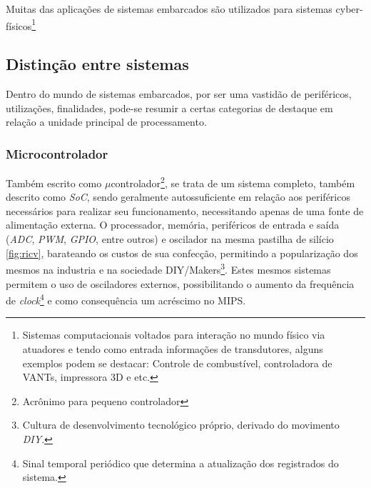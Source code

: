 Muitas das aplicações de sistemas embarcados são utilizados para sistemas cyber-físicos\footnote{Sistemas computacionais
voltados para interação no mundo físico via atuadores e tendo como entrada informações de transdutores, alguns exemplos
podem se destacar: Controle de combustível, controladora de VANTs, impressora 3D e etc.}

\subsection{Distinção entre sistemas}
Dentro do mundo de sistemas embarcados, por ser uma vastidão de periféricos, utilizações, finalidades, pode-se resumir a certas categorias de destaque em relação a unidade principal de processamento.

\subsubsection{Microcontrolador}

Também escrito como $\mu$controlador\footnote{Acrônimo para pequeno controlador}, se trata de um sistema completo,
também descrito como \textit{SoC}, sendo geralmente autossuficiente em relação aos periféricos necessários para
realizar seu funcionamento, necessitando apenas de uma fonte de alimentação externa. O processador, memória,
periféricos de entrada e saída (\textit{ADC}, \textit{PWM}, \textit{GPIO}, entre outros) e oscilador na mesma pastilha
de silício \ref{fig:ricv}, barateando os custos de sua confecção, permitindo a popularização dos mesmos na industria e na sociedade
DIY/Makers\footnote{Cultura de desenvolvimento tecnológico próprio, derivado do movimento \textit{DIY}.}. Estes mesmos
sistemas permitem o uso de osciladores externos, possibilitando o aumento da frequência de
\textit{clock}\footnote{Sinal temporal periódico que determina a atualização dos registrados do sistema.} e como
consequência um acréscimo no MIPS.



